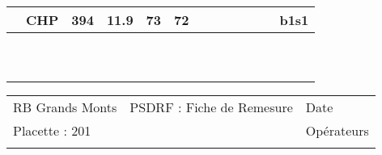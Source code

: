 \documentclass[a4paper, landscape]{article}\usepackage[]{graphicx}\usepackage[]{color}
\begin{document}
{\begin{tabular}{|p{1cm}|p{2cm}|p{1.6cm}|p{1.6cm}|p{1.6cm}|p{1.6cm}|p{1.5cm}|p{1.5cm}|p{1.5cm}|p{1.5cm}|p{1.5cm}|p{7.5cm}|p{5cm}|}
   \rowcolor[gray]{0.95} \hline
20 & CHP & 394 & 11.9 & 73 & 72 &  &  &  &  &  &  & b1s1 \\ 
   \hline
 &  &  &  &  &  &  &  &  &  &  &  &  \\ 
   \rowcolor[gray]{0.95} \hline
 &  &  &  &  &  &  &  &  &  &  &  &  \\ 
   \hline
 &  &  &  &  &  &  &  &  &  &  &  &  \\ 
   \rowcolor[gray]{0.95} \hline
 &  &  &  &  &  &  &  &  &  &  &  &  \\ 
   \hline
 &  &  &  &  &  &  &  &  &  &  &  &  \\ 
   \rowcolor[gray]{0.95} \hline
 &  &  &  &  &  &  &  &  &  &  &  &  \\ 
   \hline
 &  &  &  &  &  &  &  &  &  &  &  &  \\ 
   \rowcolor[gray]{0.95} \hline
 &  &  &  &  &  &  &  &  &  &  &  &  \\ 
   \hline
 &  &  &  &  &  &  &  &  &  &  &  &  \\ 
   \rowcolor[gray]{0.95} \hline
 &  &  &  &  &  &  &  &  &  &  &  &  \\ 
   \hline
\end{tabular}
}

\begin{tabular}{p{10cm}p{10cm}p{8cm}}
  RB Grands Monts & PSDRF : Fiche de Remesure & Date \\ 
  Placette : 201 &  & Opérateurs \\ 
   &  &  \\ 
  \end{tabular}
\end{document}
